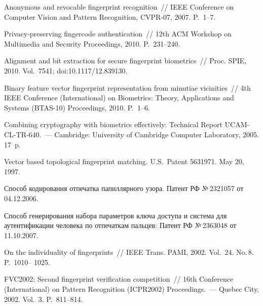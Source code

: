 \begin{multicols}{2}
{{\begin{thebibliography}{99}
Anonymous and revocable fingerprint recognition~// IEEE Conference on Computer Vision and 
Pattern Recognition, CVPR-07, 2007. P.~1--7. 

Privacy-preserving fingercode authentication~// 12th ACM Workshop on Multimedia and 
Security Proceedings, 2010. P.~231--240.

Alignment and bit extraction for secure fingerprint biometrics~// Proc. SPIE, 2010. Vol.~7541; 
doi:10.1117/12.839130. 


Binary feature vector fingerprint representation from minutiae vicinities~//  4th IEEE  
Conference (International) on Biometrics: Theory, Applications and Systems (BTAS-10) 
Proceedings, 2010. P.~1--6.

Combining cryptography with biometrics effectively: Technical Report UCAM-CL-TR-640.~--- 
Cambridge: University of Cambridge Computer Laboratory, 2005. 17~p.

Vector based topological fingerprint matching. U.S.\ Patent 5631971. May 20, 1997.

Способ кодирования отпечатка папиллярного узора. Патент РФ №\,2321057 от 04.12.2006.

Способ генерирования набора параметров ключа доступа и система для аутентификации 
человека по отпечаткам пальцев: Патент РФ №\,2363048 от 11.10.2007.

On the individuality of fingerprints~// IEEE Trans. PAMI, 2002. Vol.~24. No.\,8. P.~1010--
1025. 

\label{end\stat}

FVC2002: Second fingerprint verification competition~// 16th Conference (International) on 
Pattern Recognition (ICPR2002) Proceedings.~--- Quebec City, 2002. Vol.~3. P.~811--814.
 \end{thebibliography}
}
}


\end{multicols}       

\newpage